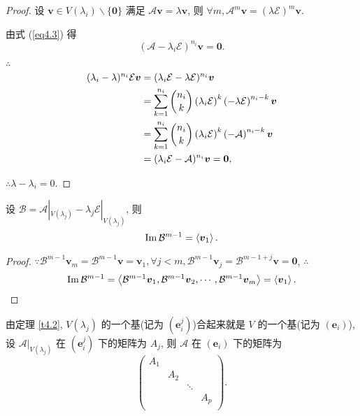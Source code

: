 \documentclass[color=black,device=normal,lang=cn,mode=geye]{elegantnote}
\begin{document}
\begin{proof}
    设 $\boldsymbol{v}\in V(\lambda_i)\backslash\{\boldsymbol{0}\}$ 满足 $\mathcal{A}\boldsymbol{v}=\lambda\boldsymbol{v}$, 则 $\forall m,\mathcal{A}^m\boldsymbol{v}=(\lambda\mathcal{E})^m\boldsymbol{v}$.

    由式 (\ref{eq4.3}) 得
    \[(\mathcal{A}-\lambda_i\mathcal{E})^{n_i}\boldsymbol{v}=\boldsymbol{0}.\]

    $\therefore$
    \begin{align*}
        (\lambda_i-\lambda)^{n_i}\mathcal{E}\boldsymbol{v} & =(\lambda_i\mathcal{E}-\lambda\mathcal{E})^{n_i}\boldsymbol{v} \\
        & =\sum\limits_{k=1}^{n_i}\dbinom{n_i}{k}\left(\lambda_i\mathcal{E}\right)^k\left(-\lambda\mathcal{E}\right)^{n_i-k}\boldsymbol{v} \\
        & =\sum\limits_{k=1}^{n_i}\dbinom{n_i}{k}\left(\lambda_i\mathcal{E}\right)^k\left(-\mathcal{A}\right)^{n_i-k}\boldsymbol{v} \\
        & =(\lambda_i\mathcal{E}-\mathcal{A})^{n_i}\boldsymbol{v}=\boldsymbol{0},
    \end{align*}

    $\therefore\lambda-\lambda_i=0$.
\end{proof}
\begin{corollary}
    设 $\mathcal{B}=\mathcal{A}|_{V(\lambda_j)}-\lambda_j\mathcal{E}|_{V(\lambda_j)}$, 则
    \[\operatorname{Im} \mathcal{B}^{m-1}=\left<\boldsymbol{v}_1\right>.\]
\end{corollary}
\begin{proof}
    $\because\mathcal{B}^{m-1}\boldsymbol{v}_m=\mathcal{B}^{m-1}\boldsymbol{v}=\boldsymbol{v}_1,\forall j<m,\mathcal{B}^{m-1}\boldsymbol{v}_j=\mathcal{B}^{m-1+j}\boldsymbol{v}=\boldsymbol{0}$, $\therefore$
    \[\operatorname{Im} \mathcal{B}^{m-1}=\left<\mathcal{B}^{m-1}\boldsymbol{v}_1,\mathcal{B}^{m-1}\boldsymbol{v}_2,\cdots,\mathcal{B}^{m-1}\boldsymbol{v}_m\right>=\left<\boldsymbol{v}_1\right>.\qedhere\]
\end{proof}
由定理 \ref{t4.2}, $V(\lambda_j)$ 的一个基(记为 $(\boldsymbol{e}^j_i)$)合起来就是 $V$ 的一个基(记为 $(\boldsymbol{e}_i)$), 设 $\mathcal{A}|_{V(\lambda_j)}$ 在 $(\boldsymbol{e}^j_i)$ 下的矩阵为 $A_j$, 则 $\mathcal{A}$ 在 $(\boldsymbol{e}_i)$ 下的矩阵为
\[\begin{pmatrix}
    A_1 \\
    & A_2 \\
    && \ddots \\
    &&& A_p \\
\end{pmatrix}.\]
\end{document}
